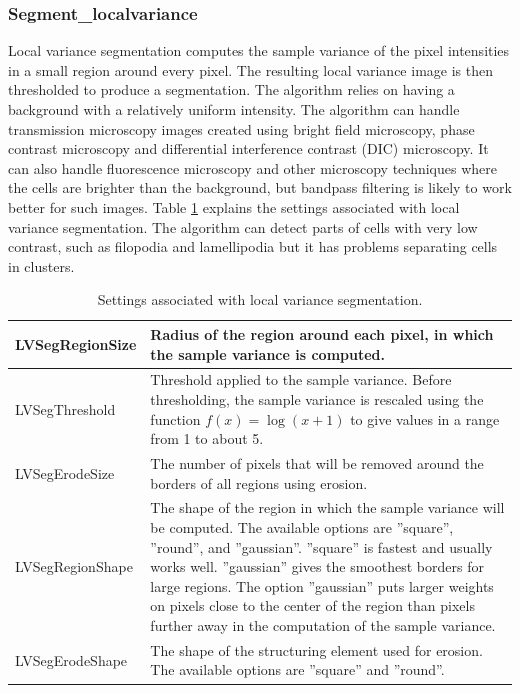 \documentclass[a4paper, oneside, onecolumn, 11pt]{article}
\newcommand{\setting}[1]{''#1''}
\begin{document}
\subsubsection{Segment\_localvariance}
Local variance segmentation computes the sample variance of the pixel intensities in a small region around every pixel. The resulting local variance image is then thresholded to produce a segmentation. The algorithm relies on having a background with a relatively uniform intensity. The algorithm can handle transmission microscopy images created using bright field microscopy, phase contrast microscopy and differential interference contrast (DIC) microscopy. It can also handle fluorescence microscopy and other microscopy techniques where the cells are brighter than the background, but bandpass filtering is likely to work better for such images. Table \ref{tab:local-variance-settings} explains the settings associated with local variance segmentation. The algorithm can detect parts of cells with very low contrast, such as filopodia and lamellipodia but it has problems separating cells in clusters.

\begin{table}[!htb]
\caption{Settings associated with local variance segmentation.}
\label{tab:local-variance-settings}
\begin{tabularx}{\textwidth}{lX}
\hline
LVSegRegionSize & Radius of the region around each pixel, in which the sample variance is computed. \\[5pt] \hline
LVSegThreshold & Threshold applied to the sample variance. Before thresholding, the sample variance is rescaled using the function $f(x) = \log(x+1)$ to give values in a range from 1 to about 5. \\[5pt] \hline
LVSegErodeSize & The number of pixels that will be removed around the borders of all regions using erosion. \\[5pt] \hline
LVSegRegionShape & The shape of the region in which the sample variance will be computed. The available options are \setting{square},  \setting{round}, and \setting{gaussian}. \setting{square} is fastest and usually works well. \setting{gaussian} gives the smoothest borders for large regions. The option \setting{gaussian} puts larger weights on pixels close to the center of the region than pixels further away in the computation of the sample variance. \\[5pt] \hline
LVSegErodeShape & The shape of the structuring element used for erosion. The available options are \setting{square} and \setting{round}. \\[5pt] \hline
\end{tabularx}
\end{table}
\end{document}
